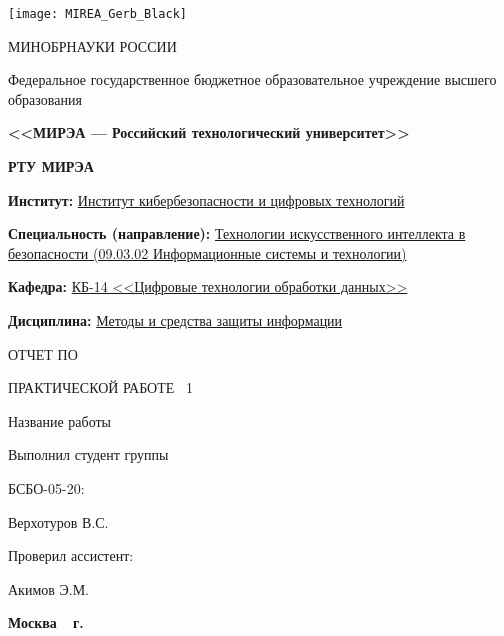 \documentclass[14pt, a4paper, titlepage]{extarticle}
\begin{document}
\begin{titlepage}
    \pagestyle{empty}
    \setlength\parindent{0pt}
    \begin{center}
        \texttt{[image: MIREA\_Gerb\_Black]} \par
        МИНОБРНАУКИ РОССИИ \par 
        Федеральное государственное бюджетное образовательное учреждение высшего образования \par
        \textbf{<<МИРЭА --- Российский технологический университет>>} \par
        \textbf{РТУ МИРЭА}
    \end{center}
    \bigskip\par
    \textbf{Институт:} \uline{Институт кибербезопасности и цифровых технологий} \par
    \textbf{Специальность (направление):} \uline{Технологии искусственного интеллекта в безопасности (09.03.02 Информационные системы и технологии)} \par
    \textbf{Кафедра:} \uline{КБ-14 <<Цифровые технологии обработки данных>>} \par
    \textbf{Дисциплина:} \uline{Методы и средства защиты информации} \bigskip\par
    \begin{center}
        ОТЧЕТ ПО \par
        ПРАКТИЧЕСКОЙ РАБОТЕ \textnumero{}~1 \par
        Название работы
    \end{center}
    \begin{flushright}
        Выполнил студент группы \par
        БСБО-05-20: \par
        Верхотуров В.С. \par
        Проверил ассистент: \par
        Акимов Э.М.
    \end{flushright}
    \begin{center}
        \vfill \textbf{Москва~\the\year{}~г.}
    \end{center}
\end{titlepage}
\addtocounter{page}{1} %
\end{document}
